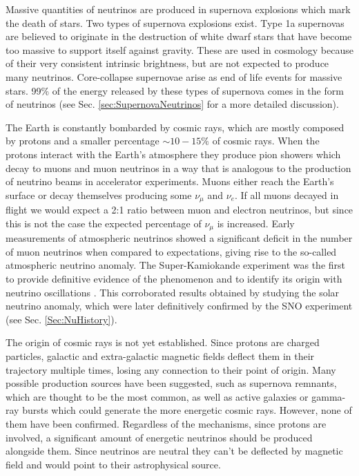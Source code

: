 Massive quantities of neutrinos are produced in supernova explosions which mark the death of stars. Two types of supernova explosions exist. Type 1a supernovas are believed to originate in the destruction of white dwarf stars that have become too massive to support itself against gravity. These are used in cosmology because of their very consistent intrinsic brightness, but are not expected to produce many neutrinos. Core-collapse supernovae arise as end of life events for massive stars. 99\% of the energy released by these types of supernova comes in the form of neutrinos (see Sec. \ref{sec:SupernovaNeutrinos} for a more detailed discussion).

The Earth is constantly bombarded by cosmic rays, which are mostly composed by protons and a smaller percentage $\sim10-15\%$ of cosmic rays. When the protons interact with the Earth's atmosphere they produce pion showers which decay to muons and muon neutrinos in a way that is analogous to the production of neutrino beams in accelerator experiments. Muons either reach the Earth's surface or decay themselves producing some $\nu_\mu$ and $\nu_e$. If all muons decayed in flight we would expect a 2:1 ratio between muon and electron neutrinos, but since this is not the case the expected percentage of $\nu_\mu$ is increased. Early measurements of atmospheric neutrinos showed a significant deficit in the number of muon neutrinos when compared to expectations, giving rise to the so-called atmospheric neutrino anomaly. The Super-Kamiokande experiment was the first to provide definitive evidence of the phenomenon and to identify its origin with neutrino oscillations \cite{Kajita:2016vhj}. This corroborated results obtained by studying the solar neutrino anomaly, which were later definitively confirmed by the SNO experiment (see Sec. \ref{Sec:NuHistory}). 

The origin of cosmic rays is not yet established. Since protons are charged particles, galactic and extra-galactic magnetic fields deflect them in their trajectory multiple times, losing any connection to their point of origin. Many possible production sources have been suggested, such as supernova remnants, which are thought to be the most common, as well as active galaxies or gamma-ray bursts which could generate the more energetic cosmic rays. However, none of them have been confirmed. Regardless of the mechanisms, since protons are involved, a significant amount of energetic neutrinos should be produced alongside them. Since neutrinos are neutral they can't be deflected by magnetic field and would point to their astrophysical source.

